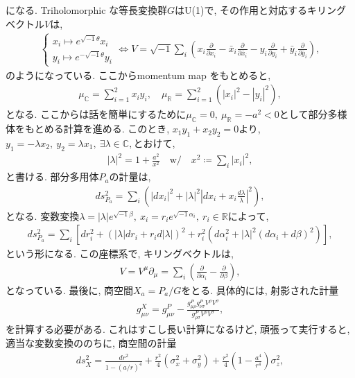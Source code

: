 \documentclass{ltjsarticle}
\theoremstyle{definition}
\begin{document}
になる. Triholomorphic な等長変換群$G$はU(1)で, その作用と対応するキリングベクトル$V$は,
\begin{align}
  \begin{cases}
    x_i\mapsto e^{\sqrt{-1}\theta}x_i\\
    y_i\mapsto e^{-\sqrt{-1}\theta}y_i
  \end{cases}
  \Leftrightarrow
  V=\sqrt{-1}\sum_i\left(x_i\frac\partial{\partial x_i}-\bar x_i\frac\partial{\partial\bar x_i}-y_i\frac\partial{\partial y_i}+\bar y_i\frac\partial{\partial\bar y_i}\right),
\end{align}
のようになっている. ここからmomentum map をもとめると,
\begin{gather}
  \mu_\mathbb C=\sum_{i=1}^2x_iy_i,\quad\mu_\mathbb R=\sum_{i=1}^2\left(|x_i|^2-|y_i|^2\right),
\end{gather}
となる. ここからは話を簡単にするために$\mu_\mathbb C=0,\ \mu_\mathbb R=-a^2<0$として部分多様体をもとめる計算を進める. このとき, $x_1y_1+x_2y_2=0$より, $y_1=-\lambda x_2,\ y_2=\lambda x_1,\ \exists\lambda\in\mathbb C,$とおけて,
\begin{gather}
  |\lambda|^2=1+\frac{a^2}{x^2}\quad\mathrm{w/}\quad x^2\coloneqq\sum_i|x_i|^2,
\end{gather}
と書ける. 部分多用体$P_a$の計量は,
\begin{gather}
  ds_{P_a}^2=\sum_i\left(|dx_i|^2+|\lambda|^2\left|dx_i+x_i\frac{d\lambda}\lambda\right|^2\right),
\end{gather}
となる. 変数変換$\lambda=|\lambda|e^{\sqrt{{-1}}\beta},\ x_i=r_ie^{\sqrt{-1}\alpha_i},\ r_i\in\mathbb R$によって,
\begin{gather}
  ds_{P_a}^2=\sum_i\left[dr_i^2+\left(|\lambda|dr_i+r_id|\lambda|\right)^2+r_i^2\left(d\alpha_i^2+|\lambda|^2\left(d\alpha_i+d\beta\right)^2\right)\right],
\end{gather}
という形になる. この座標系で, キリングベクトルは,
\begin{gather}
  V=V^\mu\partial_\mu=\sum_i\left(\frac\partial{\partial\alpha_i}-\frac\partial{\partial\beta}\right),
\end{gather}
となっている. 最後に, 商空間$X_a=P_a/G$をとる. 具体的には, 射影された計量
\begin{gather}
  g^X_{\mu\nu}=g^P_{\mu\nu}-\frac{g^P_{\mu\rho}g^P_{\nu\sigma}V^\rho V^\sigma}{g^P_{\rho\sigma}V^\rho V^\sigma},
\end{gather}
を計算する必要がある. これはすこし長い計算になるけど, 頑張って実行すると, 適当な変数変換ののちに, 商空間の計量
\begin{gather}
  ds_X^2=\frac{dr^2}{1-(a/r)^4}+\frac{r^2}4\left(\sigma_x^2+\sigma_y^2\right)+\frac{r^2}4\left(1-\frac{a^4}{r^4}\right)\sigma_z^2,\label{eq:eguchi_hanson_metric}
\end{gather}
\end{document}
